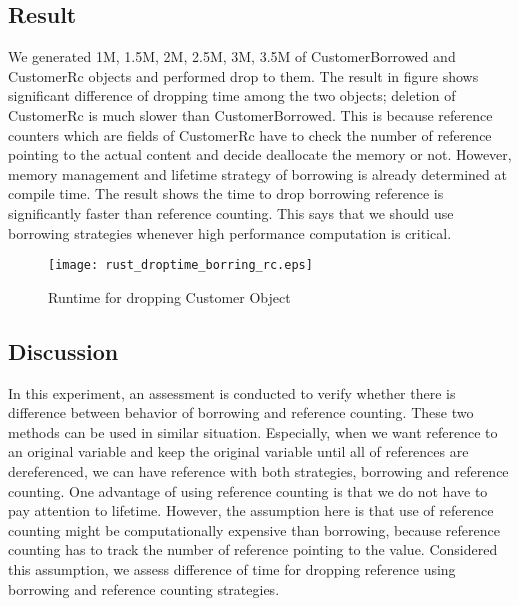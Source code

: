 \subsection{Result}
We generated 1M, 1.5M, 2M, 2.5M, 3M, 3.5M of CustomerBorrowed and CustomerRc objects and performed drop to them. 
The result in figure shows significant difference of dropping time among the two objects; deletion of CustomerRc is much slower than CustomerBorrowed. 
This is because reference counters which are fields of CustomerRc have to check the number of reference pointing to the actual content and decide 
deallocate the memory or not. However, memory management and lifetime strategy of borrowing is already determined at compile time.
The result shows the time to drop borrowing reference is significantly faster than reference counting. This says that we should use borrowing strategies whenever high performance computation is critical.
\begin{figure}[htb!]
    \texttt{[image: rust\_droptime\_borring\_rc.eps]}
    \caption{Runtime for dropping Customer Object}
    \label{fig:Sampling}
\end{figure}



\subsection{Discussion}
In this experiment, an assessment is conducted to verify whether there is difference between behavior of borrowing and reference counting. 
These two methods can be used in similar situation. Especially, when we want reference to an original variable and keep the original variable until all of references are dereferenced, 
we can have reference with both strategies, borrowing and reference counting. One advantage of using reference counting is that we do not have to pay attention to lifetime.
However, the assumption here is that use of reference counting might be computationally expensive than borrowing, because reference counting has to track the number of reference pointing to the value. 
Considered this assumption, we assess difference of time for dropping reference using borrowing and reference counting strategies. 